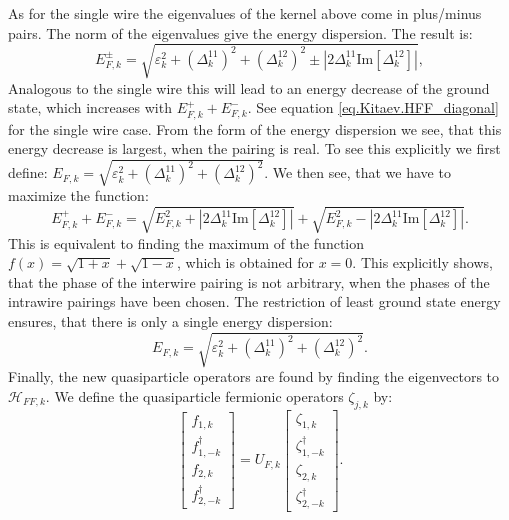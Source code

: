 As for the single wire the eigenvalues of the kernel above come in plus/minus pairs. The norm of the eigenvalues give the energy dispersion. The result is:
\begin{equation}
E^{\pm}_{F,k} = \sqrt{\varepsilon^2_k + \left(\Delta^{11}_k\right)^2 + \left(\Delta^{12}_k\right)^2 \pm \left|2\Delta^{11}_k\text{Im}\left[\Delta^{12}_k\right]\right|}, 
\end{equation} 
Analogous to the single wire this will lead to an energy decrease of the ground state, which increases with $E^{+}_{F,k} + E^{-}_{F,k}$. See equation \eqref{eq.Kitaev.HFF_diagonal} for the single wire case. From the form of the energy dispersion we see, that this energy decrease is largest, when the pairing is real. To see this explicitly we first define: $E_{F,k} = \sqrt{\varepsilon^2_k + \left(\Delta^{11}_k\right)^2 + \left(\Delta^{12}_k\right)^2}$. We then see, that we have to maximize the function:
\begin{equation}
E^{+}_{F,k} + E^{-}_{F,k} = \sqrt{E^2_{F,k} + \left|2\Delta^{11}_k\text{Im}\left[\Delta^{12}_k\right]\right|} + \sqrt{E^2_{F,k} - \left|2\Delta^{11}_k\text{Im}\left[\Delta^{12}_k\right]\right|}. \nonumber
\end{equation}
This is equivalent to finding the maximum of the function $f(x) = \sqrt{1 + x} + \sqrt{1 - x}$, which is obtained for $x = 0$. This explicitly shows, that the phase of the interwire pairing is not arbitrary, when the phases of the intrawire pairings have been chosen. The restriction of least ground state energy ensures, that there is only a single energy dispersion:
\begin{equation}
E_{F,k} = \sqrt{\varepsilon^2_k + \left(\Delta^{11}_k\right)^2 + \left(\Delta^{12}_k\right)^2}.
\label{eq.energydispersiontwowires}
\end{equation}
Finally, the new quasiparticle operators are found by finding the eigenvectors to $\mathcal{H}_{FF,k}$. We define the quasiparticle fermionic operators $\zeta_{j,k}$ by:
\begin{equation}
\begin{bmatrix} f_{1,k} \\ f^\dagger_{1,-k} \\ f_{2,k} \\ f^\dagger_{2,-k} \end{bmatrix} = U_{F,k}\begin{bmatrix} \zeta_{1,k} \\ \zeta^{\dagger}_{1,-k} \\ \zeta_{2,k} \\ \zeta^{\dagger}_{2,-k} \end{bmatrix}.
\label{eq.zetaoperatorstwowiresdefinition}
\end{equation} 
